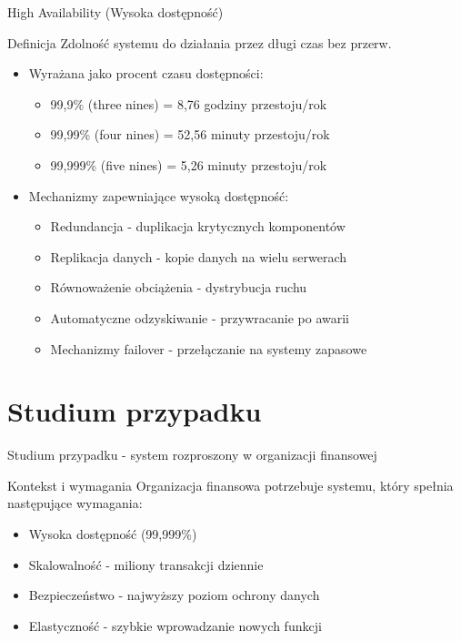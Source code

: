 \documentclass[aspectratio=169]{beamer}
\begin{document}
\begin{frame}{High Availability (Wysoka dostępność)}
    \begin{block}{Definicja}
        Zdolność systemu do działania przez długi czas bez przerw.
    \end{block}
    
    \begin{itemize}
        \item Wyrażana jako procent czasu dostępności:
        \begin{itemize}
            \item 99,9\% (three nines) = 8,76 godziny przestoju/rok
            \item 99,99\% (four nines) = 52,56 minuty przestoju/rok
            \item 99,999\% (five nines) = 5,26 minuty przestoju/rok
        \end{itemize}
        \vspace{0.3cm}
        \item Mechanizmy zapewniające wysoką dostępność:
        \begin{itemize}
            \item Redundancja - duplikacja krytycznych komponentów
            \item Replikacja danych - kopie danych na wielu serwerach
            \item Równoważenie obciążenia - dystrybucja ruchu
            \item Automatyczne odzyskiwanie - przywracanie po awarii
            \item Mechanizmy failover - przełączanie na systemy zapasowe
        \end{itemize}
    \end{itemize}
\end{frame}

\section{Studium przypadku}

\begin{frame}{Studium przypadku - system rozproszony w organizacji finansowej}
    \begin{block}{Kontekst i wymagania}
        Organizacja finansowa potrzebuje systemu, który spełnia następujące wymagania:
        \begin{itemize}
            \item Wysoka dostępność (99,999\%)
            \item Skalowalność - miliony transakcji dziennie
            \item Bezpieczeństwo - najwyższy poziom ochrony danych
            \item Elastyczność - szybkie wprowadzanie nowych funkcji
        \end{itemize}
    \end{block}
\end{frame}
\end{document}
